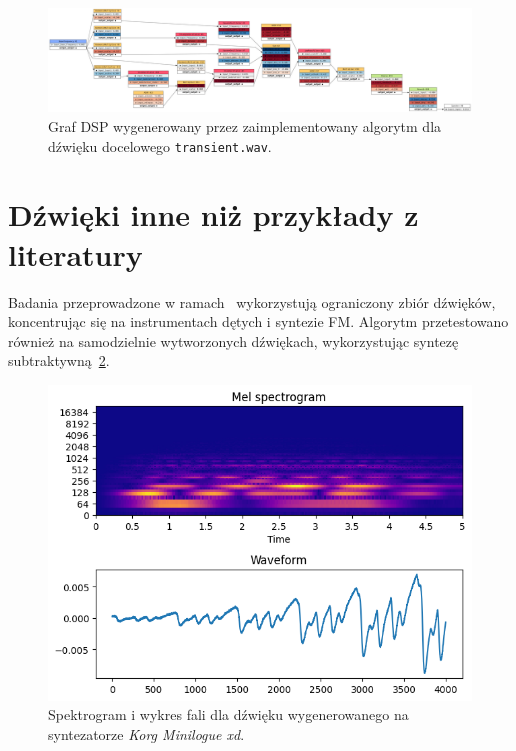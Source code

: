 \begin{figure}
    \centering
    \includegraphics[angle=90,width=0.35\linewidth]{rys06/evolved_graph_transient.png}
    \caption{
      Graf DSP wygenerowany przez zaimplementowany algorytm
      dla dźwięku docelowego \texttt{transient.wav}.
    }\label{fig:evolved_graph_transient}
\end{figure}



\section{Dźwięki inne niż przykłady z literatury}\label{sec:non_literature_samples}

Badania przeprowadzone w ramach~\cite{evolutionary_puredata}
wykorzystują ograniczony zbiór dźwięków, koncentrując
się na instrumentach dętych i syntezie FM\@. Algorytm przetestowano
również na samodzielnie wytworzonych dźwiękach, wykorzystując syntezę
subtraktywną~\ref{fig:minilogue_target_sample}.

\begin{figure}[H]
    \centering
    \includegraphics[width=0.7\linewidth]{rys06/target_minilogue.png}
    \caption{
      Spektrogram i wykres fali dla dźwięku wygenerowanego 
      na syntezatorze \textit{Korg Minilogue xd}.
    }\label{fig:minilogue_target_sample}
\end{figure}

